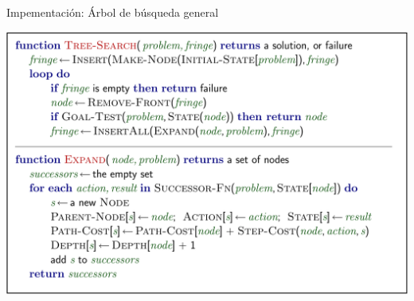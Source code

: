 \begin{frame}{Impementación: Árbol de búsqueda general}
\begin{right}

\includegraphics[scale = 0.5]{30_general_tree_search.png}

\end{right}
\end{frame}